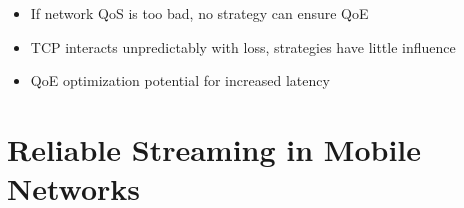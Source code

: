 \documentclass{beamer}
\begin{document}
\begin{frame}
	\begin{itemize}
		\item If network QoS is too bad, no strategy can ensure QoE
		\item TCP interacts unpredictably with loss, strategies have little influence
		\item QoE optimization potential for increased latency
	\end{itemize}


\end{frame}


\section{Reliable Streaming in Mobile Networks}
\end{document}
